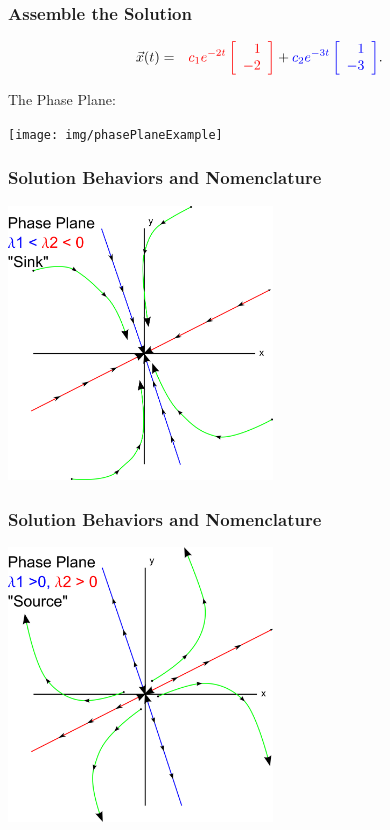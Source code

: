 \begin{frame}
  \frametitle{Assemble the Solution}

  \begin{eqnarray*}
    \vec{x}(t) & = & {\color{red}c_1 e^{-2t} \left[ \begin{array}{r} 1 \\ -2 \end{array} \right]} + {\color{blue}c_2 e^{-3t} \left[ \begin{array}{r} 1 \\ -3 \end{array} \right]}.
  \end{eqnarray*}

  The Phase Plane:\\
  \centerline{\texttt{[image: img/phasePlaneExample]}}


\end{frame}



%
%

\begin{frame}
  \frametitle{Solution Behaviors and Nomenclature}

  \includegraphics[width=7cm]{img/phasePlaneSink}
 
\end{frame}

\begin{frame}
  \frametitle{Solution Behaviors and Nomenclature}
    \includegraphics[width=7cm]{img/phasePlaneSource}
\end{frame}

